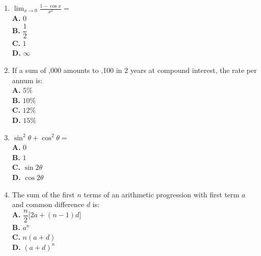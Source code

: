 \documentclass[11pt]{article}
\begin{document}
\begin{enumerate}[label=Q\arabic*., leftmargin=*]
\item $\displaystyle \lim_{x\to 0} \frac{1 - \cos x}{x^2} =$ 
\\[0.3em]
\textbf{A.} $0$\\
\textbf{B.} $\dfrac{1}{2}$\\
\textbf{C.} $1$\\
\textbf{D.} $\infty$

\item If a sum of ,000 amounts to ,100 in 2 years at compound interest, the rate per annum is:
\\[0.3em]
\textbf{A.} $5\%$\\
\textbf{B.} $10\%$\\
\textbf{C.} $12\%$\\
\textbf{D.} $15\%$

\item $\sin^2\theta + \cos^2\theta =$ 
\\[0.3em]
\textbf{A.} $0$\\
\textbf{B.} $1$\\
\textbf{C.} $\sin 2\theta$\\
\textbf{D.} $\cos 2\theta$

\item The sum of the first $n$ terms of an arithmetic progression with first term $a$ and common difference $d$ is:
\\[0.3em]
\textbf{A.} $\dfrac{n}{2}\bigl[2a + (n-1)d\bigr]$\\
\textbf{B.} $a^{n}$\\
\textbf{C.} $n(a+d)$\\
\textbf{D.} $(a+d)^{n}$
\end{enumerate}
\end{document}
